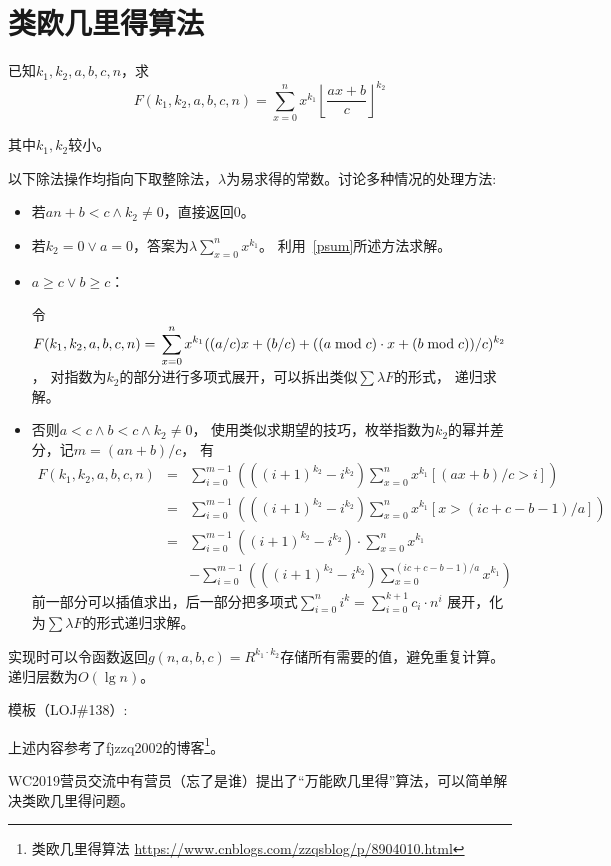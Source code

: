 \section{类欧几里得算法}
已知$k_1,k_2,a,b,c,n$，求
\begin{displaymath}
    F(k_1,k_2,a,b,c,n)=\sum_{x=0}^n{x^{k_1}
    {\left \lfloor\frac{ax+b}{c}\right \rfloor}^{k_2}}
\end{displaymath}

其中$k_1,k_2$较小。

以下除法操作均指向下取整除法，$\lambda$为易求得的常数。讨论多种情况的处理方法:
\begin{itemize}
    \item 若$an+b<c \wedge k_2\neq 0$，直接返回0。
    \item 若$k_2=0 \vee a=0$，答案为$\lambda \displaystyle \sum_{x=0}^n{x^{k_1}}$。
    利用~\ref{psum}所述方法求解。
    \item $a\geq c \vee b\geq c$：

    令$\displaystyle F(k_1,k_2,a,b,c,n)=\\\sum_{x=0}^n{x^{k_1}
    ((a/c)x+(b/c)+((a \bmod c) \cdot x+(b\bmod c))/c)^{k_2}}$，
    对指数为$k_2$的部分进行多项式展开，可以拆出类似$\sum{\lambda F}$的形式，
    递归求解。

    \item 否则$a<c \wedge b<c \wedge k_2 \neq 0$，
    使用类似求期望的技巧，枚举指数为$k_2$的幂并差分，记$m=(an+b)/c$，
    有\begin{eqnarray*}
        F(k_1,k_2,a,b,c,n)&=&\sum_{i=0}^{m-1}{\left(
            ((i+1)^{k_2}-i^{k_2})\sum_{x=0}^n{
                x^{k_1}[(ax+b)/c>i]
            }
        \right)}\\
        &=&\sum_{i=0}^{m-1}{\left(
            ((i+1)^{k_2}-i^{k_2})\sum_{x=0}^n{
                x^{k_1}[x>(ic+c-b-1)/a]
            }
        \right)}\\
        &=&\sum_{i=0}^{m-1}{((i+1)^{k_2}-i^{k_2})}
        \cdot \sum_{x=0}^n{x^{k_1}}\\
        & &-\sum_{i=0}^{m-1}{\left(
            ((i+1)^{k_2}-i^{k_2})\sum_{x=0}^{(ic+c-b-1)/a}{
                x^{k_1}
            }
        \right)}
    \end{eqnarray*}
    前一部分可以插值求出，后一部分把多项式$\displaystyle \sum_{i=0}^n{i^k}=
    \sum_{i=0}^{k+1}{c_i\cdot n^i}$
    展开，化为$\sum{\lambda F}$的形式递归求解。
\end{itemize}

实现时可以令函数返回$g(n,a,b,c)=R^{k_1\cdot k_2}$存储所有需要的值，避免重复计算。
递归层数为$O(\lg n)$。

模板（LOJ\#138）:


上述内容参考了fjzzq2002的博客\footnote{
    类欧几里得算法
    \url{https://www.cnblogs.com/zzqsblog/p/8904010.html}
}。

WC2019营员交流中有营员（忘了是谁）提出了``万能欧几里得''算法，可以简单解决类欧几里得问题。
